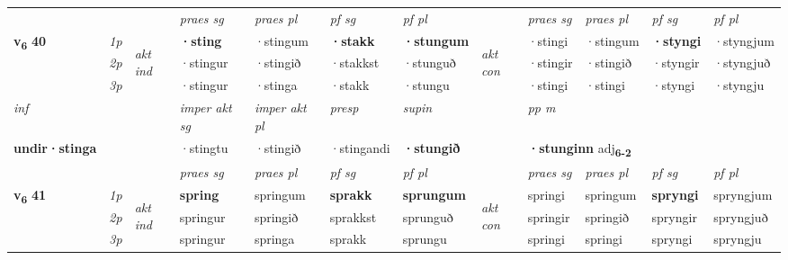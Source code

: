 \begin{longtable}[l]{X>{\footnotesize\itshape}llXXXXlXXXX}
\midrule

 & &   & \textit{praes sg}  & \textit{praes pl}    & \textit{ pf sg} & \textit{pf pl} & & \textit{praes sg}  & \textit{praes pl}    & \textit{pf sg} & \textit{pf pl }  \\ \cmidrule{4-7} \cmidrule{9-12}
 \multirow{2}{*}{{{\textbf{v{\textsubscript{6}}} \Large{\textbf{40}}}}}  & 1p & \multirow{3}{*}{\begin{turn}{90}\textit{akt ind}\end{turn}} & \textbf{·sting} & ·stingum & \textbf{·stakk} & \textbf{·stungum} & \multirow{3}{*}{\begin{turn}{90}\textit{akt con}\end{turn}} &·stingi & ·stingum & \textbf{·styngi} & ·styngjum\\*
 & 2p &  &  ·stingur  & ·stingið & ·stakkst & ·stunguð & & ·stingir & ·stingið & ·styngir & ·styngjuð \\*
 & 3p &  & ·stingur & ·stinga & ·stakk & ·stungu & & ·stingi & ·stingi& ·styngi & ·styngju \\*
\cmidrule{4-7} \cmidrule{9-12}

   {\textit{inf}} & &  & \textit{imper akt sg} & \textit{imper akt pl}   & \textit{presp} & \textit{supin}  && \textit{pp m} \\*
  {\textbf{undir\allowbreak ·stinga}} & && ·stingtu  & ·stingið   & ·stingandi &  \textbf{·stungið}  && \multicolumn{2}{l}{\textbf{·stunginn} adj\textbf{\textsubscript{6-2}}} \\*

\midrule

 & &   & \textit{praes sg}  & \textit{praes pl}    & \textit{ pf sg} & \textit{pf pl} & & \textit{praes sg}  & \textit{praes pl}    & \textit{pf sg} & \textit{pf pl }  \\ \cmidrule{4-7} \cmidrule{9-12}
 \multirow{2}{*}{{{\textbf{v{\textsubscript{6}}} \Large{\textbf{41}}}}}  & 1p & \multirow{3}{*}{\begin{turn}{90}\textit{akt ind}\end{turn}} & \textbf{spring} & springum & \textbf{sprakk} & \textbf{sprungum} & \multirow{3}{*}{\begin{turn}{90}\textit{akt con}\end{turn}} &springi & springum & \textbf{spryngi} & spryngjum\\*
 & 2p &  &  springur  & springið & sprakkst & sprunguð & & springir & springið & spryngir & spryngjuð \\*
 & 3p &  & springur & springa & sprakk & sprungu & & springi & springi& spryngi & spryngju \\*
\cmidrule{4-7} \cmidrule{9-12}


\end{longtable}
